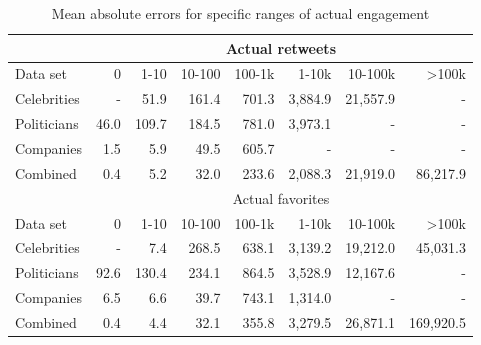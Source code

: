 \begin{table}
  \begin{tabular}{lrrrrrrr}
    \toprule
    & \multicolumn{7}{c}{Actual retweets} \\
    \midrule
    Data set & 0 & 1-10 & 10-100 & 100-1k & 1-10k & 10-100k & >100k \\
    \midrule
    Celebrities & - & 51.9 & 161.4 & 701.3 & 3,884.9 & 21,557.9 & - \\
    Politicians & 46.0 & 109.7 & 184.5 & 781.0 & 3,973.1 & - & - \\
    Companies & 1.5 & 5.9 & 49.5 & 605.7 & - & - & - \\
    Combined & 0.4 & 5.2 & 32.0 & 233.6 & 2,088.3 & 21,919.0 & 86,217.9 \\
    \bottomrule
    \toprule
    & \multicolumn{7}{c}{Actual favorites} \\
    \midrule
    Data set & 0 & 1-10 & 10-100 & 100-1k & 1-10k & 10-100k & >100k \\
    \midrule
    Celebrities & - & 7.4 & 268.5 & 638.1 & 3,139.2 & 19,212.0 & 45,031.3 \\
    Politicians & 92.6 & 130.4 & 234.1 & 864.5 & 3,528.9 & 12,167.6 & - \\
    Companies & 6.5 & 6.6 & 39.7 & 743.1 & 1,314.0 & - & - \\
    Combined & 0.4 & 4.4 & 32.1 & 355.8 & 3,279.5 & 26,871.1 & 169,920.5 \\
    \bottomrule
  \end{tabular}
  \caption[Detailed regression results for deep feedforward networks]{Mean absolute errors for specific ranges of actual engagement}
  \label{tab:d1_regression_eval}
\end{table}

